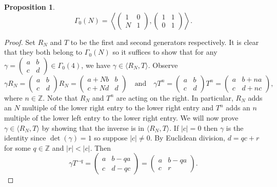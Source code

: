 \documentclass[12pt]{book}
\newtheorem{proposition}{Proposition}[section]
\theoremstyle{definition}\newframedtheorem{method}{Method}
\newcommand{\Z}{\mathbb{Z}}
\newcommand{\g}{\gamma}
\newcommand{\G}{\Gamma}
\newcommand{\<}{\langle}
\renewcommand{\>}{\rangle}
\begin{document}
    \begin{proposition}\label{prop:Hecke_congruence_generator}
      \[
        \G_{0}(N) = \left\<\begin{pmatrix} 1 & 0 \\ N & 1 \end{pmatrix},\begin{pmatrix} 1 & 1 \\ 0 & 1 \end{pmatrix}\right\>.
      \]
    \end{proposition}
    \begin{proof}
      Set $R_{N}$ and $T$ to be the first and second generators respectively. It is clear that they both belong to $\G_{0}(N)$ so it suffices to show that for any $\g = \begin{pmatrix} a & b \\ c & d \end{pmatrix} \in \G_{0}(4)$, we have $\g \in \<R_{N},T\>$. Observe
      \[
        \g R_{N} = \begin{pmatrix} a & b \\ c & d \end{pmatrix}R_{N} = \begin{pmatrix} a+Nb & b \\ c+Nd & d \end{pmatrix} \quad \text{and} \quad \g T^{n} = \begin{pmatrix} a & b \\ c & d \end{pmatrix}T^{n} = \begin{pmatrix} a & b+na \\ c & d+nc \end{pmatrix},
      \]
      where $n \in \Z$. Note that $R_{N}$ and $T^{n}$ are acting on the right. In particular, $R_{N}$ adds an $N$ multiple of the lower right entry to the lower right entry and $T^{n}$ adds an $n$ multiple of the lower left entry to the lower right entry. We will now prove $\g \in \<R_{N},T\>$ by showing that the inverse is in $\<R_{N},T\>$. If $|c| = 0$ then $\g$ is the identity since $\det(\g) = 1$ so suppose $|c| \neq 0$. By Euclidean division, $d = qc+r$ for some $q \in \Z$ and $|r| < |c|$. Then
      \[
        \g T^{-q} = \begin{pmatrix} a & b-qa \\ c & d-qc \end{pmatrix} = \begin{pmatrix} a & b-qa \\ c & r \end{pmatrix}.
\]
\end{proof}
\end{document}

